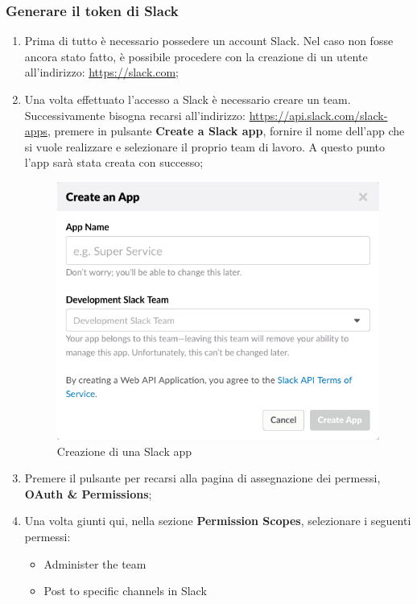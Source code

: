 \documentclass[../ManualeSviluppatore_v2.0.0.tex]{subfiles}
\begin{document}
		\subsubsection{Generare il \gls{token} di Slack}
			\begin{enumerate}
				\item Prima di tutto è necessario possedere un account Slack. Nel caso non fosse ancora stato fatto, è possibile procedere con la creazione di un utente all'indirizzo: \url{https://slack.com};
				\item Una volta effettuato l'accesso a Slack è necessario creare un team. Successivamente bisogna recarsi all'indirizzo: \url{https://api.slack.com/slack-apps}, premere in pulsante \textbf{Create a Slack app}, fornire il nome dell'app che si vuole realizzare e selezionare il proprio team di lavoro. A questo punto l'app sarà stata creata con successo;
				\begin{figure}[!h]
					\centering
					\includegraphics[scale=0.54]{Screenshot/CreateSlack.png}
					\caption{Creazione di una Slack app}
				\end{figure}
				\item Premere il pulsante per recarsi alla pagina di assegnazione dei permessi, \textbf{OAuth \& Permissions};
				\newpage
				\item Una volta giunti qui, nella sezione \textbf{Permission Scopes}, selezionare i seguenti permessi:
					\begin{itemize}
					\item Administer the team
					\item Post to specific channels in Slack

\end{itemize}
\end{enumerate}
\end{document}
